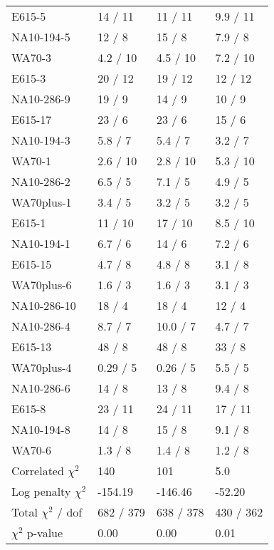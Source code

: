 \documentclass[12pt]{report}
\begin{document}
\begin{table}
\begin{center}
{\begin{tabular}{lp{2.20cm}p{2.20cm}p{2.20cm}}
  E615-5 & 14 / 11& 11 / 11& 9.9 / 11  \\ 
  NA10-194-5 & 12 / 8& 15 / 8& 7.9 / 8  \\ 
  WA70-3 & 4.2 / 10& 4.5 / 10& 7.2 / 10  \\ 
  E615-3 & 20 / 12& 19 / 12& 12 / 12  \\ 
  NA10-286-9 & 19 / 9& 14 / 9& 10 / 9  \\ 
  E615-17 & 23 / 6& 23 / 6& 15 / 6  \\ 
  NA10-194-3 & 5.8 / 7& 5.4 / 7& 3.2 / 7  \\ 
  WA70-1 & 2.6 / 10& 2.8 / 10& 5.3 / 10  \\ 
  NA10-286-2 & 6.5 / 5& 7.1 / 5& 4.9 / 5  \\ 
  WA70plus-1 & 3.4 / 5& 3.2 / 5& 3.2 / 5  \\ 
  E615-1 & 11 / 10& 17 / 10& 8.5 / 10  \\ 
  NA10-194-1 & 6.7 / 6& 14 / 6& 7.2 / 6  \\ 
  E615-15 & 4.7 / 8& 4.8 / 8& 3.1 / 8  \\ 
  WA70plus-6 & 1.6 / 3& 1.6 / 3& 3.1 / 3  \\ 
  NA10-286-10 & 18 / 4& 18 / 4& 12 / 4  \\ 
  NA10-286-4 & 8.7 / 7& 10.0 / 7& 4.7 / 7  \\ 
  E615-13 & 48 / 8& 48 / 8& 33 / 8  \\ 
  WA70plus-4 & 0.29 / 5& 0.26 / 5& 5.5 / 5  \\ 
  NA10-286-6 & 14 / 8& 13 / 8& 9.4 / 8  \\ 
  E615-8 & 23 / 11& 24 / 11& 17 / 11  \\ 
  NA10-194-8 & 14 / 8& 15 / 8& 9.1 / 8  \\ 
  WA70-6 & 1.3 / 8& 1.4 / 8& 1.2 / 8  \\ 
  Correlated $\chi^2$  & 140& 101& 5.0  \\ 
  Log penalty $\chi^2$  & -154.19& -146.46& -52.20  \\ 
  \rowcolor{white}
      \midrule
  Total $\chi^2$ / dof  & 682 / 379& 638 / 378& 430 / 362  \\ 
  \rowcolor{white}
      \midrule
  $\chi^2$ p-value  & 0.00 & 0.00 & 0.01   \\ 
      \bottomrule
    \end{tabular}
  }
  \end{center}
\end{table}
\end{document}
